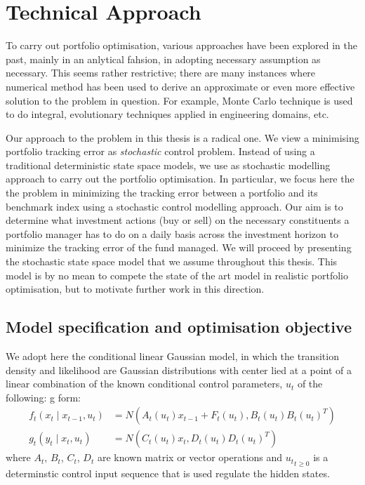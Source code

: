 \section{Technical Approach}
To carry out portfolio optimisation, various approaches have been explored in the past, mainly in an anlytical fahsion, in adopting necessary assumption as necessary. This seems rather restrictive; there are many instances where numerical method has been used to derive an approximate or even more effective solution to the problem in question. For example, Monte Carlo technique is used to do integral, evolutionary techniques applied in engineering domains, etc.

Our approach to the problem in this thesis is a radical one. We view a minimising portfolio tracking error as \emph{stochastic} control problem. Instead of using a traditional deterministic state space models, we use as stochastic modelling approach to carry out the portfolio optimisation. In particular, we focus here the the problem in minimizing the tracking error between a portfolio and its benchmark index using a stochastic control modelling approach. Our aim is to determine what investment actions (buy or sell) on the necessary constituents a portfolio manager has to do on a daily basis across the investment horizon to minimize the tracking error of the fund managed. We will proceed by presenting the stochastic state space model that we assume throughout this thesis. This model is by no mean to compete the state of the art model in realistic portfolio optimisation, but to motivate further work in this direction.

\subsection{Model specification and optimisation objective}
We adopt here the conditional linear Gaussian model, in which the transition density and likelihood are Gaussian distributions with center lied at a point of a linear combination of the known conditional control parameters, $u_t$ of the following:
g form:
\begin{align}
  f_t(x_t \mid x_{t-1}, u_t) &= N(A_t(u_t) x_{t-1} + F_t(u_t), B_t(u_t)B_t(u_t)^T) \nonumber \\
  g_t(y_t \mid x_t, u_t)    &= N(C_t(u_t) x_t, D_t(u_t)D_t(u_t)^T)
\end{align}
where $A_t$, $B_t$, $C_t$, $D_t$ are known matrix or vector operations and ${u_t}_{t \geq 0}$ is a determinstic control input sequence that is used regulate the hidden states.

